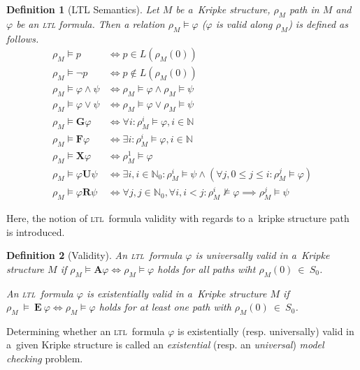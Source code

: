 \documentclass[12pt,oneside,draft]{fithesis}
\newcommand{\ltl}{\textsc{ltl}~}
\newcommand{\mNatural}{\mathbb{N}}
\newcommand{\bF}{\mathbf{F}}
\newcommand{\bG}{\mathbf{G}}
\newcommand{\bX}{\mathbf{X}}
\newcommand{\bU}{\mathbf{U}}
\newcommand{\bR}{\mathbf{R}}
\newcommand{\bA}{\mathbf{A}}
\newcommand{\bE}{\mathbf{E}}
\newtheorem{mydef}{Definition}
\begin{document}
\begin{mydef}[LTL Semantics]
Let $M$ be a~Kripke structure, $\rho_M$ path in $M$ and $\varphi$ be
an \textsc{ltl} formula. Then a relation $\rho_M\models\varphi$
($\varphi$ is valid along $\rho_M$) is defined as follows\cite{clarke}.
\begin{align}
	\rho_M\models p&\iff p\in L(\rho_M(0))\\
	\rho_M\models\neg p&\iff p\notin L(\rho_M(0))\\
	\rho_M\models \varphi\wedge\psi&\iff\rho_M\models\varphi\wedge
		\rho_M\models\psi\\
	\rho_M\models \varphi\vee\psi&\iff\rho_M\models\varphi\vee
		\rho_M\models\psi\\
	\rho_M\models\bG\varphi&\iff\forall i:\rho_M^i\models\varphi,
		i\in\mNatural\\
	\rho_M\models\bF\varphi&\iff\exists i:\rho_M^i\models\varphi,
		i\in\mNatural\\
	\rho_M\models\bX\varphi&\iff\rho_M^1\models\varphi\\
	\rho_M\models\varphi\bU\psi&\iff\exists i,i\in\mNatural_0:
		\rho_M^i\models\psi\wedge(\forall j,0\leq j\leq i:
			\rho_M^j\models\varphi)\\
	\rho_M\models\varphi\bR\psi&\iff\forall j,j\in\mNatural_0,
		\forall i,i<j:\rho_M^i\not\models\varphi\implies
			\rho_M^j\models\psi
\end{align}
\end{mydef}

Here, the notion of \ltl formula validity with regards to a~kripke
structure path is introduced.
\begin{mydef}[Validity]
An \ltl formula $\varphi$ is universally valid in a~Kripke structure $M$
if $\rho_M\models\bA\varphi\iff\rho_M\models\varphi$ holds for all
paths wiht $\rho_M(0)~\in~S_0$.

An \ltl formula $\varphi$ is existentially valid in a~Kripke structure
$M$ if $\rho_M~\models~\bE~\varphi\iff\rho_M\models\varphi$ holds for
at least one path with $\rho_M(0)~\in~S_0$\cite{biere}.
\end{mydef}


Determining whether an \ltl formula $\varphi$ is existentially (resp.
universally) valid in a~given Kripke structure is called an
\emph{existential} (resp. an \emph{universal}) \emph{model checking}
problem\cite{biere}.
\end{document}
